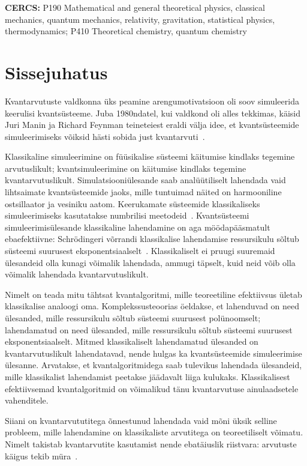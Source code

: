 \documentclass[12pt]{report}
\begin{document}
\noindent\textbf{CERCS:}
P190 Mathematical and general theoretical physics, classical mechanics, quantum
mechanics, relativity, gravitation, statistical physics, thermodynamics; P410 Theoretical chemistry, quantum chemistry

\tableofcontents

\chapter{Sissejuhatus}

Kvantarvutuste valdkonna üks peamine arengumotivatsioon oli soov simuleerida keerulisi kvantsüsteeme.
Juba 1980ndatel, kui valdkond oli alles tekkimas, käisid Juri Manin ja Richard Feynman teineteiest eraldi välja idee, et kvantsüsteemide simuleerimiseks võiksid hästi sobida just kvantarvuti~\cite{manin, feynman}.

Klassikaline simuleerimine on füüsikalise süsteemi käitumise kindlaks tegemine arvutuslikult; kvantsimuleerimine on käitumise kindlaks tegemine kvantarvutuslikult.
Simulatsiooniülesande saab analüütiliselt lahendada vaid lihtsaimate kvantsüsteemide jaoks, mille tuntuimad näited on harmooniline ostsillaator ja vesiniku aatom.
Keerukamate süsteemide klassikaliseks simuleerimiseks kasutatakse numbrilisi meetodeid~\cite{szabo+ostlund, whitfield+etal2011}.
Kvantsüsteemi simuleerimisülesande klassikaline lahendamine on aga möödapääsmatult ebaefektiivne: Schrödingeri võrrandi klassikalise lahendamise ressursikulu sõltub süsteemi suurusest eksponentsiaalselt~\cite{whitfield+etal2011, mcardle+etal, cao+etal, kassal+etal}.
Klassikaliselt ei pruugi suuremaid ülesandeid olla kunagi võimalik lahendada, ammugi täpselt, kuid neid võib olla võimalik lahendada kvantarvutuslikult.

Nimelt on teada mitu tähtsat kvantalgoritmi, mille teoreetiline efektiivsus ületab klassikalise analoogi oma.
Komplekssusteoorias öeldakse, et lahenduvad on need ülesanded, mille ressursikulu sõltub süsteemi suurusest polünoomselt; lahendamatud on need ülesanded, mille ressursikulu sõltub süsteemi suurusest eksponentsiaalselt.
Mitmed klassikaliselt lahendamatud ülesanded on kvantarvutuslikult lahendatavad, nende hulgas ka kvantsüsteemide simuleerimise ülesanne.
Arvatakse, et kvantalgoritmidega saab tulevikus lahendada ülesandeid, mille klassikalist lahendamist peetakse jäädavalt liiga kulukaks.
Klassikalisest efektiivsemad kvantalgoritmid on võimalikud tänu kvantarvutuse ainulaadsetele vahenditele.

Siiani on kvantarvututitega õnnestunud lahendada vaid mõni üksik selline probleem, mille lahendamine on klassikaliste arvutitega on teoreetiliselt võimatu.
Nimelt takistab kvantarvutite kasutamist nende ebatäiuslik riistvara: arvutuste käigus tekib müra~\cite{whitfield+etal2022}.
\end{document}
